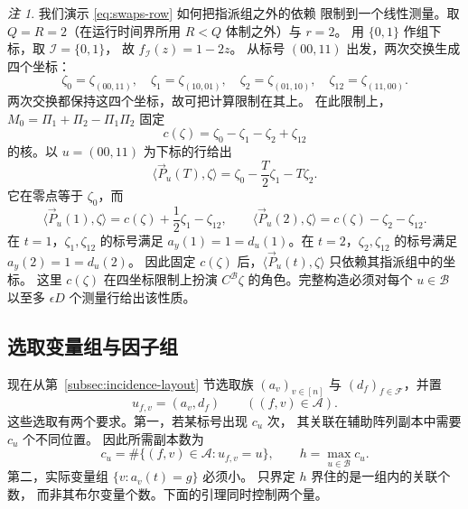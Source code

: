 \documentclass[11pt,reqno]{amsart}
\numberwithin{equation}{section}
\theoremstyle{definition}\newtheorem{definition}[theorem]{定义}
\theoremstyle{remark}\newtheorem{remark}[theorem]{注}
\begin{document}
\begin{remark}
我们演示 \eqref{eq:swaps-row} 如何把指派组之外的依赖
限制到一个线性测量。取 $Q=R=2$（在运行时间界所用
$R<Q$ 体制之外）与 $r=2$。
用 $\{0,1\}$ 作组下标，取 $\mathcal I=\{0,1\}$，
故 $f_{\mathcal I}(z)=1-2z$。
从标号 $(00,11)$ 出发，两次交换生成四个坐标：
\[
 \zeta_0=\zeta_{(00,11)},\quad \zeta_1=\zeta_{(10,01)},\quad
 \zeta_2=\zeta_{(01,10)},\quad \zeta_{12}=\zeta_{(11,00)}.
\]
两次交换都保持这四个坐标，故可把计算限制在其上。
在此限制上，$M_0=\Pi_1+\Pi_2-\Pi_1\Pi_2$
固定
\[
 c(\zeta)=\zeta_0-\zeta_1-\zeta_2+\zeta_{12}
\]
的核。以 $u=(00,11)$ 为下标的行给出
\[
 \langle \vec{P}_u(T), \zeta\rangle=\zeta_0-\frac T2\zeta_1-T\zeta_2.
\]
它在零点等于 $\zeta_0$，而
\[
 \langle \vec{P}_u(1), \zeta\rangle=c(\zeta)+\frac12\zeta_1-\zeta_{12},\qquad
 \langle \vec{P}_u(2), \zeta\rangle=c(\zeta)-\zeta_2-\zeta_{12}.
\]
在 $t=1$，$\zeta_1,\zeta_{12}$ 的标号满足
$a_y(1)=1=d_u(1)$。在 $t=2$，$\zeta_2,\zeta_{12}$
的标号满足 $a_y(2)=1=d_u(2)$。
因此固定 $c(\zeta)$ 后，$\langle \vec{P}_u(t), \zeta\rangle$
只依赖其指派组中的坐标。
这里 $c(\zeta)$ 在四坐标限制上扮演 $C^{\mathcal B}\zeta$
的角色。完整构造必须对每个 $u\in\mathcal B$
以至多 $\epsilon D$ 个测量行给出该性质。
\end{remark}

\subsection{选取变量组与因子组}\label{subsec:choosing-labels}
现在从第~\ref{subsec:incidence-layout} 节选取族
$(a_v)_{v\in[n]}$ 与 $(d_f)_{f\in\mathcal F}$，并置
\[
 u_{f,v}=(a_v,d_f)\qquad((f,v)\in\mathcal A).
\]
这些选取有两个要求。第一，若某标号出现 $c_u$ 次，
其关联在辅助阵列副本中需要 $c_u$ 个不同位置。
因此所需副本数为
\[
 c_u=\#\{(f,v)\in\mathcal A:u_{f,v}=u\},\qquad
 h=\max_{u\in\mathcal B}c_u.
\]
第二，实际变量组 $\{v:a_v(t)=g\}$ 必须小。
只界定 $h$ 界住的是一组内的关联个数，
而非其布尔变量个数。下面的引理同时控制两个量。
\end{document}
